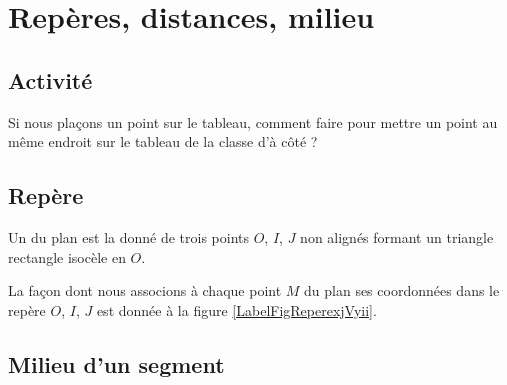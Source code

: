 \section{Repères, distances, milieu}

\subsection{Activité}

Si nous plaçons un point sur le tableau, comment faire pour mettre un point au même endroit sur le tableau de la classe d'à côté ?

\subsection{Repère}

\begin{definition}
    Un  du plan est la donné de trois points \( O\), \( I\), \( J\) non alignés formant un triangle rectangle isocèle en  \( O\).
\end{definition}

La façon dont nous associons à chaque point \( M\) du plan ses coordonnées dans le repère \( O\), \( I\), \( J\) est donnée à la figure \ref{LabelFigReperexjVyii}.
\newcommand{\CaptionFigReperexjVyii}{Lire les coordonnées du point \( M\) dans le repère \( OIJ\).}


\subsection{Milieu d'un segment}

